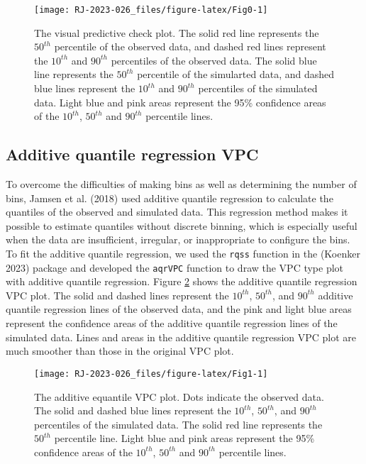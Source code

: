 \begin{figure}
\texttt{[image: RJ-2023-026\_files/figure-latex/Fig0-1]} \caption{The visual predictive check plot. The solid red line represents the $50^{th}$ percentile of the observed data, and dashed red lines represent the $10^{th}$ and $90^{th}$ percentiles of the observed data. The solid blue line represents the $50^{th}$ percentile of the simularted data, and dashed blue lines represent the $10^{th}$ and $90^{th}$ percentiles of the simulated data. Light blue and pink areas represent the 95\% confidence areas of the $10^{th}$, $50^{th}$ and $90^{th}$ percentile lines.}\label{fig:Fig0}
\end{figure}

\hypertarget{additive-quantile-regression-vpc}{%
\subsection{Additive quantile regression VPC}\label{additive-quantile-regression-vpc}}

To overcome the difficulties of making bins as well as determining the number of bins,
Jamsen et al. (2018) used additive quantile regression to calculate the quantiles of the observed and simulated data. This regression method makes it possible to estimate quantiles without discrete binning, which is especially useful when the data are insufficient, irregular, or inappropriate to configure the bins. To fit the additive quantile regression, we used the \texttt{rqss} function in the  (Koenker 2023) package and developed the \texttt{aqrVPC} function to draw the VPC type plot with additive quantile regression. Figure \ref{fig:Fig1} shows the additive quantile regression VPC plot. The solid and dashed lines represent the \(10^{th}\), \(50^{th}\), and \(90^{th}\) additive quantile regression lines of the observed data, and the pink and light blue areas represent the confidence areas of the additive quantile regression lines of the simulated data. Lines and areas in the additive quantile regression VPC plot are much smoother than those in the original VPC plot.

\begin{figure}
\texttt{[image: RJ-2023-026\_files/figure-latex/Fig1-1]} \caption{The additive equantile VPC plot.  Dots indicate the observed data. The solid and dashed blue lines represent the $10^{th}$, $50^{th}$, and $90^{th}$ percentiles of the simulated data. The solid red line represents the $50^{th}$ percentile line. Light blue and pink areas represent the 95\% confidence areas of the $10^{th}$, $50^{th}$ and $90^{th}$ percentile lines.}\label{fig:Fig1}
\end{figure}

